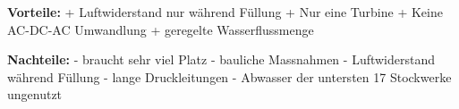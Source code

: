 \bigskip

\textbf{Vorteile:} 									\newline
+	Luftwiderstand nur während Füllung				\newline
+	Nur eine Turbine									\newline
+	Keine AC-DC-AC Umwandlung						\newline
+	geregelte Wasserflussmenge						\newline

\textbf{Nachteile:}									\newline
-	braucht sehr viel Platz 							\newline
-	bauliche Massnahmen								\newline
-	Luftwiderstand während Füllung					\newline
- 	lange Druckleitungen								\newline
-	Abwasser der untersten 17 Stockwerke ungenutzt	\newline
\WFclear